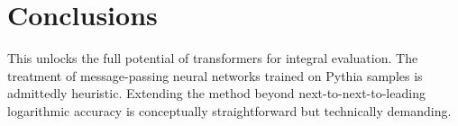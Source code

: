 \section{Conclusions}\label{sec:conclusions}

This unlocks the full potential of transformers for integral evaluation.
The treatment of message-passing neural networks trained on Pythia
samples is admittedly heuristic. Extending the method beyond
next-to-next-to-leading logarithmic accuracy is conceptually
straightforward but technically demanding.

